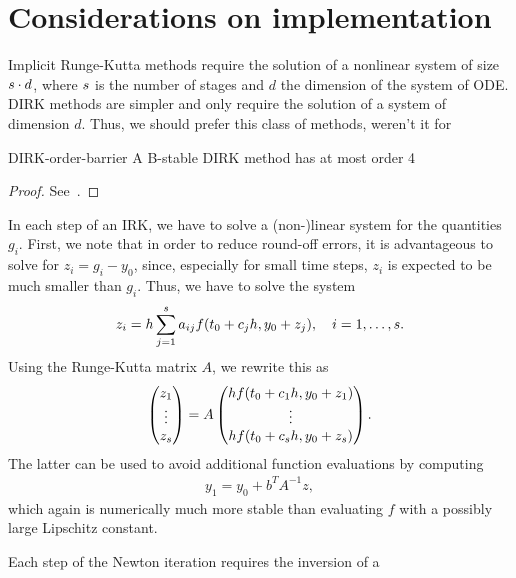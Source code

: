 \section{Considerations on implementation}

\begin{intro}
  Implicit Runge-Kutta methods require the solution of a nonlinear
  system of size $s\cdot d$, where $s$ is the number of stages
  and $d$ the dimension of the system of ODE. DIRK methods are simpler
  and only require the solution of a system of dimension $d$. Thus, we
  should prefer this class of methods, weren't it for
\end{intro}

\begin{Theorem}{DIRK-order-barrier}
  A B-stable DIRK method has at most order 4
\end{Theorem}

\begin{proof}
  See~\cite[Theorem 13.13]{HairerWanner10}.
\end{proof}

\begin{remark}
  In each step of an IRK, we have to solve a (non-)linear system for
  the quantities $g_i$. First, we note that in order to reduce
  round-off errors, it is advantageous to solve for $z_i = g_i-y_0$,
  since, especially for small time steps, $z_i$ is expected to be much
  smaller than $g_i$. Thus, we have to solve the system
  \begin{gather}
    \label{eq:implicit:21}
    z_i = h \sum_{j=1}^{s} a_{ij} f(t_0+c_jh, y_0+z_j),
    \quad
    i=1,\dots,s.
  \end{gather}
  Using the Runge-Kutta matrix $A$, we rewrite this as
  \begin{gather}
    \label{eq:implicit:22}
    \begin{pmatrix}
      z_1\\\vdots\\z_s
    \end{pmatrix}
    = A
    \begin{pmatrix}
      hf(t_0+c_1h, y_0+z_1)
      \\\vdots\\
      hf(t_0+c_s h, y_0+z_s)
    \end{pmatrix}.
  \end{gather}
  The latter can be used to avoid additional function evaluations by
  computing
  \begin{gather}
    \label{eq:implicit:23}
    y_1 = y_0 + b^TA^{-1}z, 
  \end{gather}
  which again is numerically much more stable than evaluating $f$ with
  a possibly large Lipschitz constant.
\end{remark}

\begin{remark}
  Each step of the Newton iteration requires the inversion of a 
\end{remark}
